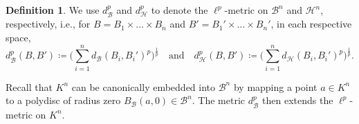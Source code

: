 \documentclass[10pt]{article}
\theoremstyle{definition}
\newtheorem{definition}[theorem]{Definition}
\def\log{{\rm log}}
\newcommand{\RR}{\mathbb{R}}
\newcommand{\val}{{\mathrm{val}}}
\begin{document}
\begin{definition}
  We use $d_{\mathcal{B}}^p$ and $d_{\mathcal{H}}^p$ to denote the $\ell^p$-metric on $\mathcal B^n$ and $\mathcal H^n$, respectively, i.e., for $B=B_1\times\dots\times B_n$ and $B'=B_1'\times\dots\times B_n'$, in each respective space,
  \begin{equation*}
    d_{\mathcal{B}}^p(B,B')\coloneqq\Big(\sum_{i=1}^n d_{\mathcal{B}}(B_i,B_i')^p\Big)^{\frac{1}{p}} \quad\text{and}\quad d_{\mathcal{H}}^p(B,B')\coloneqq\Big(\sum_{i=1}^n d_{\mathcal{H}}(B_i,B_i')^p\Big)^{\frac{1}{p}}.
  \end{equation*}
\end{definition}

Recall that $K^n$ can be canonically embedded into $\mathcal B^n$ by mapping a point $a\in K^n$ to a polydisc of radius zero $B_{\mathcal{B}}(a,0)\in \mathcal B^n$.  The metric $d_{\mathcal{B}}^p$ then extends the $\ell^p$-metric on $K^n$.
\end{document}
